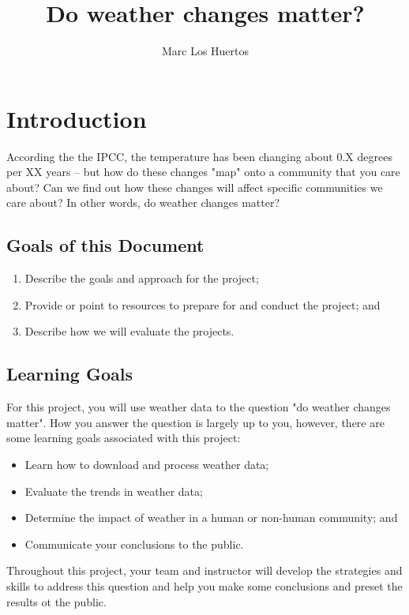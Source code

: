 \documentclass{article}\usepackage[]{graphicx}\usepackage[]{color}
\title{Do weather changes matter?}
\author{Marc Los Huertos}
\begin{document}
\maketitle

\section{Introduction}

According the the IPCC, the temperature has been changing about 0.X degrees per XX years -- but how do these changes "map" onto a community that you care about?  Can we find out how these changes will affect specific communities we care about? In other words, do weather changes matter?

\subsection{Goals of this Document}

\begin{enumerate}
  \item Describe the goals and approach for the project;
  \item Provide or point to resources to prepare for and conduct the project; and
  \item Describe how we will evaluate the projects.
\end{enumerate}


\subsection{Learning Goals}

For this project, you will use weather data to the question "do weather changes matter". How you answer the question is largely up to you, however, there are some learning goals associated with this project:

\begin{itemize}
  \item Learn how to download and process weather data;
  \item Evaluate the trends in weather data;
  \item Determine the impact of weather in a human or non-human community; and
  \item Communicate your conclusions to the public.
\end{itemize}

Throughout this project, your team and instructor will develop the strategies and skills to address this question and help you make some conclusions and preset the results ot the public.
\end{document}
